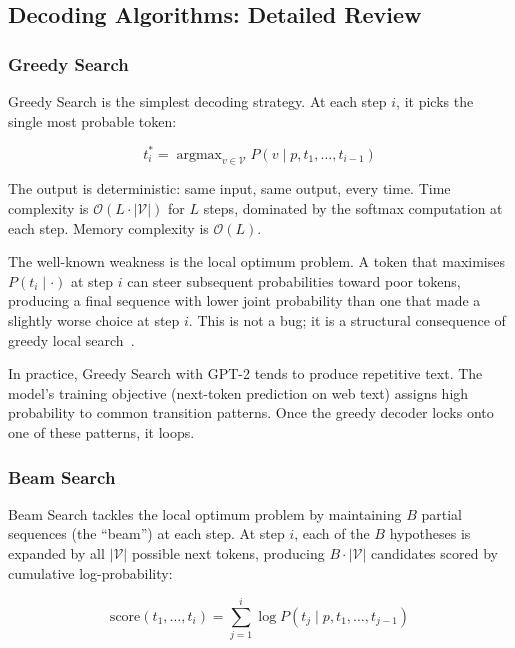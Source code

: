 \documentclass[12pt]{article}
\begin{document}
	\subsection{Decoding Algorithms: Detailed Review}
	
	\subsubsection{Greedy Search}
	\label{sec:greedy_theory}
	
	Greedy Search is the simplest decoding strategy. At each step $i$, it picks the single most probable token:
	
	\begin{equation}
		t_i^* = \operatorname{argmax}_{v \in \mathcal{V}} P(v \mid p, t_1, \ldots, t_{i-1})
		\label{eq:greedy}
	\end{equation}
	
	The output is deterministic: same input, same output, every time. Time complexity is $\mathcal{O}(L \cdot |\mathcal{V}|)$ for $L$ steps, dominated by the softmax computation at each step. Memory complexity is $\mathcal{O}(L)$.
	
	The well-known weakness is the local optimum problem. A token that maximises $P(t_i \mid \cdot)$ at step $i$ can steer subsequent probabilities toward poor tokens, producing a final sequence with lower joint probability than one that made a slightly worse choice at step $i$. This is not a bug; it is a structural consequence of greedy local search~\cite{russellnorvig2020ai}.
	
	In practice, Greedy Search with GPT-2 tends to produce repetitive text. The model's training objective (next-token prediction on web text) assigns high probability to common transition patterns. Once the greedy decoder locks onto one of these patterns, it loops.
	
	\subsubsection{Beam Search}
	\label{sec:beam_theory}
	
	Beam Search tackles the local optimum problem by maintaining $B$ partial sequences (the ``beam'') at each step. At step $i$, each of the $B$ hypotheses is expanded by all $|\mathcal{V}|$ possible next tokens, producing $B \cdot |\mathcal{V}|$ candidates scored by cumulative log-probability:
	
	\begin{equation}
		\mathrm{score}(t_1, \ldots, t_i) = \sum_{j=1}^{i} \log P(t_j \mid p, t_1, \ldots, t_{j-1})
		\label{eq:beam_score}
	\end{equation}
	
\end{document}
